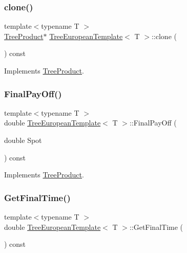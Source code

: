 \subsubsection{\texorpdfstring{clone()}{clone()}}
{\footnotesize\ttfamily template$<$typename T $>$ \\
\hyperlink{classTreeProduct}{Tree\+Product}$\ast$ \hyperlink{classTreeEuropeanTemplate}{Tree\+European\+Template}$<$ T $>$\+::clone (\begin{DoxyParamCaption}{ }\end{DoxyParamCaption}) const\hspace{0.3cm}{\ttfamily [virtual]}}



Implements \hyperlink{classTreeProduct_a38edda2bee3c7203e94511df96a18c32}{Tree\+Product}.

\hypertarget{classTreeEuropeanTemplate_a20fe052329fc532eb24931a4e7e20a63}{}\label{classTreeEuropeanTemplate_a20fe052329fc532eb24931a4e7e20a63} 
\subsubsection{\texorpdfstring{Final\+Pay\+Off()}{FinalPayOff()}}
{\footnotesize\ttfamily template$<$typename T $>$ \\
double \hyperlink{classTreeEuropeanTemplate}{Tree\+European\+Template}$<$ T $>$\+::Final\+Pay\+Off (\begin{DoxyParamCaption}\item[{double}]{Spot }\end{DoxyParamCaption}) const\hspace{0.3cm}{\ttfamily [virtual]}}



Implements \hyperlink{classTreeProduct_acda7abc61cf6ac1b0f69a09eb0709832}{Tree\+Product}.

\hypertarget{classTreeEuropeanTemplate_a124fd0032ba1a95cbf1a687884859dce}{}\label{classTreeEuropeanTemplate_a124fd0032ba1a95cbf1a687884859dce} 
\subsubsection{\texorpdfstring{Get\+Final\+Time()}{GetFinalTime()}}
{\footnotesize\ttfamily template$<$typename T $>$ \\
double \hyperlink{classTreeEuropeanTemplate}{Tree\+European\+Template}$<$ T $>$\+::Get\+Final\+Time (\begin{DoxyParamCaption}{ }\end{DoxyParamCaption}) const\hspace{0.3cm}{\ttfamily [inline]}}


